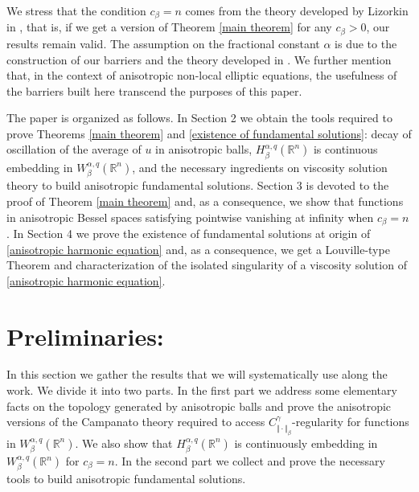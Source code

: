 \documentclass[10pt, leqno]{article}
\theoremstyle{definition}
\theoremstyle{remark}
\numberwithin{equation}{section}
\begin{document}
We stress that the condition $c_{\beta} = n$ comes from the theory developed by Lizorkin in \cite{LIZORKIN 1, LIZORKIN 2, LIZORKIN 3}, that is, if we get a version of Theorem \ref{main theorem} for any $c_{\beta} > 0$, our results remain valid. The assumption on the fractional constant $\alpha$ is due to the construction of our barriers and the theory developed in \cite{CLU, SL}. We further mention that, in the context of anisotropic non-local elliptic equations, the usefulness of the barriers built here transcend the purposes of this paper.

The paper is organized as follows. In Section 2 we obtain the tools required to prove Theorems \ref{main theorem} and \ref{existence of fundamental solutions}: decay of oscillation of the average of $u$ in anisotropic balls, $H_{\beta}^{\alpha, q}(\mathbb{R}^{n})$ is continuous embedding in $W_{\beta}^{\alpha, q}(\mathbb{R}^{n})$, and the necessary ingredients on viscosity solution theory to build anisotropic fundamental solutions. Section 3 is devoted to the proof of Theorem \ref{main theorem} and, as a consequence, we show that functions in anisotropic Bessel spaces satisfying pointwise vanishing at infinity when $c_{\beta} = n$. In Section 4 we prove the existence of fundamental solutions at origin of \eqref{anisotropic harmonic equation} and, as a consequence, we get a Louville-type Theorem and characterization of the isolated singularity of a viscosity solution of \eqref{anisotropic harmonic equation}.


\section{Preliminaries:}
In this section we gather the results that we will systematically use along the work. We divide it into two parts. In the first part we address some elementary facts on the topology generated by anisotropic balls and prove the anisotropic versions of the Campanato theory required to access $C^{\gamma}_{\Vert \cdot \Vert_{\beta}}$-regularity for functions in $W_{\beta}^{\alpha, q}(\mathbb{R}^{n})$. We also show that $H_{\beta}^{\alpha, q}(\mathbb{R}^{n})$ is continuously embedding in $W_{\beta}^{\alpha, q}(\mathbb{R}^{n})$ for $c_{\beta}=n$. In the second part we collect and prove the necessary tools to build anisotropic fundamental solutions.
\end{document}
